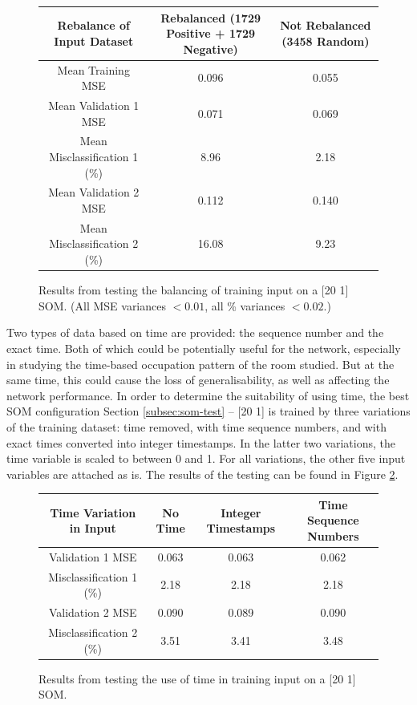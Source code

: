 \documentclass[10pt, oneside]{article}
\begin{document}
\begin{figure}[h]
\begin{center}
\fontsize{9}{11}\selectfont
\begin{tabular}{|c|c|c|}
\hline 
Rebalance of Input Dataset & Rebalanced (1729 Positive + 1729 Negative) & Not Rebalanced (3458 Random) \\ \hline
Mean Training MSE & 0.096 & 0.055 \\ \hline \hline 
Mean Validation 1 MSE & 0.071 & 0.069 \\ \hline 
Mean Misclassification 1 (\%) & 8.96 & 2.18 \\ \hline \hline 
Mean Validation 2 MSE & 0.112 & 0.140 \\ \hline 
Mean Misclassification 2 (\%) & 16.08 & 9.23 \\ \hline
\end{tabular}
\end{center}
\caption{\label{fig:equalize-testing} Results from testing the balancing of training input on a [20 1] SOM. (All MSE variances $<0.01$, all \% variances $<0.02$.)}
\end{figure}

Two types of data based on time are provided: the sequence number and the exact time. Both of which could be potentially useful for the network, especially in studying the time-based occupation pattern of the room studied. But at the same time, this could cause the loss of generalisability, as well as affecting the network performance. In order to determine the suitability of using time, the best SOM configuration Section \ref{subsec:som-test} -- [20 1] is trained by three variations of the training dataset: time removed, with time sequence numbers, and with exact times converted into integer timestamps. In the latter two variations, the time variable is scaled to between 0 and 1. For all variations, the other five input variables are attached as is. The results of the testing can be found in Figure \ref{fig:time-testing}.

\begin{figure}[h]
\begin{center}
\fontsize{9}{11}\selectfont
\begin{tabular}{|c|c|c|c|}
\hline 
Time Variation in Input & No Time & Integer Timestamps & Time Sequence Numbers \\ \hline \hline 
Validation 1 MSE & 0.063 & 0.063 & 0.062 \\ \hline 
Misclassification 1 (\%) & 2.18 & 2.18 & 2.18 \\ \hline \hline 
Validation 2 MSE &  0.090 & 0.089 & 0.090 \\ \hline 
Misclassification 2 (\%) & 3.51 & 3.41 & 3.48 \\ \hline 
\end{tabular}
\end{center}
\caption{\label{fig:time-testing} Results from testing the use of time in training input on a [20 1] SOM.}
\end{figure}
\end{document}
